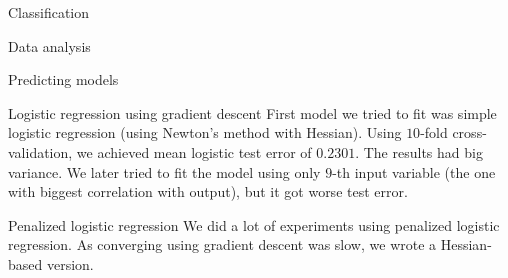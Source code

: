 \documentclass{article}
\begin{document}
\begin{section}{Classification}
\begin{subsection}{Data analysis}
\begin{figure}[!t]
\center
{}
\hfill
{}
\caption{}
\end{figure}

\end{subsection}
\begin{subsection}{Predicting models}
\begin{subsubsection}{Logistic regression using gradient descent}
First model we tried to fit was simple logistic regression (using Newton's method with Hessian). Using $10$-fold cross-validation, we achieved mean logistic test error of $0.2301$. The results had big variance. We later tried to fit the model using only $9$-th input variable (the one with biggest correlation with output), but it got worse test error.

\end{subsubsection}
\begin{subsubsection}{Penalized logistic regression}
We did a lot of experiments using penalized logistic regression. As converging using gradient descent was slow, we wrote a Hessian-based version.


\end{subsubsection}
\end{subsection}
\end{section}
\end{document}
